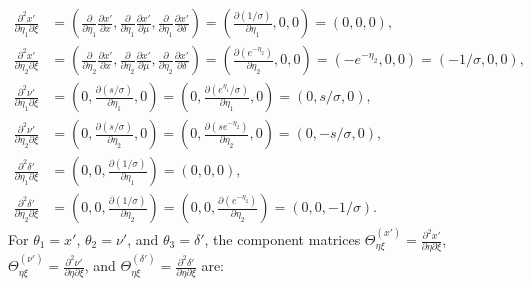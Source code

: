 \documentclass{article}
\begin{document}
\begin{align}
  \frac{\partial^2 x'}{\partial \eta_1 \partial \xi}      & = \left( \frac{\partial}{\partial \eta_1}\frac{\partial x'}{\partial x}, \frac{\partial}{\partial \eta_1}\frac{\partial x'}{\partial \mu}, \frac{\partial}{\partial \eta_1}\frac{\partial x'}{\partial \delta} \right) = \left( \frac{\partial (1/\sigma)}{\partial \eta_1}, 0, 0 \right) = (0, 0, 0),                                   \\
  \frac{\partial^2 x'}{\partial \eta_2 \partial \xi}      & = \left( \frac{\partial}{\partial \eta_2}\frac{\partial x'}{\partial x}, \frac{\partial}{\partial \eta_2}\frac{\partial x'}{\partial \mu}, \frac{\partial}{\partial \eta_2}\frac{\partial x'}{\partial \delta} \right) = \left( \frac{\partial (e^{-\eta_2})}{\partial \eta_2}, 0, 0 \right) = (-e^{-\eta_2}, 0, 0) = (-1/\sigma, 0, 0), \\
  \frac{\partial^2 \nu'}{\partial \eta_1 \partial \xi}    & = \left( 0, \frac{\partial (s/\sigma)}{\partial \eta_1}, 0 \right) = \left( 0, \frac{\partial (e^{\eta_1}/\sigma)}{\partial \eta_1}, 0 \right) = (0, s/\sigma, 0),                                                                                                                                                                       \\
  \frac{\partial^2 \nu'}{\partial \eta_2 \partial \xi}    & = \left( 0, \frac{\partial (s/\sigma)}{\partial \eta_2}, 0 \right) = \left( 0, \frac{\partial (s e^{-\eta_2})}{\partial \eta_2}, 0 \right) = (0, -s/\sigma, 0),                                                                                                                                                                          \\
  \frac{\partial^2 \delta'}{\partial \eta_1 \partial \xi} & = \left( 0, 0, \frac{\partial (1/\sigma)}{\partial \eta_1} \right) = (0, 0, 0),                                                                                                                                                                                                                                                          \\
  \frac{\partial^2 \delta'}{\partial \eta_2 \partial \xi} & = \left( 0, 0, \frac{\partial (1/\sigma)}{\partial \eta_2} \right) = \left( 0, 0, \frac{\partial (e^{-\eta_2})}{\partial \eta_2} \right) = (0, 0, -1/\sigma).
\end{align}
%
For $\theta_1 = x'$, $\theta_2 = \nu'$, and $\theta_3 = \delta'$, the component matrices $\Theta_{\eta\xi}^{(x')} = \frac{\partial^2 x'}{\partial \eta \partial \xi}$, $\Theta_{\eta\xi}^{(\nu')} = \frac{\partial^2 \nu'}{\partial \eta \partial \xi}$, and $\Theta_{\eta\xi}^{(\delta')} = \frac{\partial^2 \delta'}{\partial \eta \partial \xi}$ are:
\end{document}
